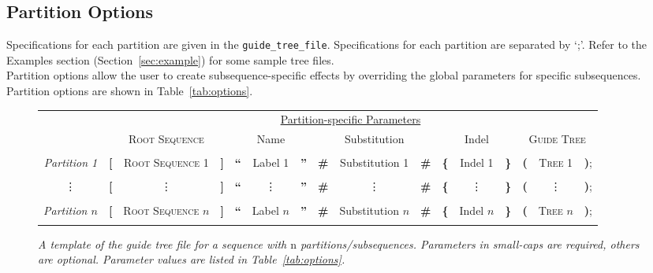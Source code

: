 \documentclass[10pt]{article}
\begin{document}
\subsection{Partition Options}
\label{sec:partition_options}

 Specifications for each partition are given in the {\tt guide\_tree\_file}. Specifications for each partition are separated by `;'. Refer to the Examples section (Section~\ref{sec:example}) for some sample tree files.\\

 Partition options allow the user to create subsequence-specific effects by overriding the global parameters for specific subsequences. Partition options are shown in Table~\ref{tab:options}.

\begin{figure}
 \begin{small}
 \begin{tabular}{c|lcrlcrlcrlcrlcr}
 \hline
 \hline
  & \multicolumn{15}{c}{\underline{Partition-specific Parameters}}
  \\

  & \multicolumn{3}{c}{\textsc{Root Sequence}}
  & \multicolumn{3}{c}{Name}
  & \multicolumn{3}{c}{Substitution} 
  & \multicolumn{3}{c}{Indel}
  & \multicolumn{3}{c}{\textsc{Guide Tree}}
  \\
 \hline
\\
 \textit{Partition 1} & 
 \textbf{[}  & \textsc{Root Sequence 1} & \textbf{]} &
 \textbf{``} & Label 1         			& \textbf{''} &
 \textbf{\#} & Substitution 1  			& \textbf{\#}&
 \textbf{\{} & Indel 1         			& \textbf{\}} &
 \textbf{(}  & \textsc{Tree 1}          & \textbf{)};
 \\
 \\
 \vdots &
 \textbf{[}  & \vdots & \textbf{]} &
 \textbf{``} & \vdots & \textbf{''} &
 \textbf{\#} & \vdots & \textbf{\#}&
 \textbf{\{} & \vdots & \textbf{\}} &
 \textbf{(}  & \vdots & \textbf{)};
 \\
 \\
 \textit{Partition $n$} &
 \textbf{[}  & \textsc{Root Sequence $n$} & \textbf{]} &
 \textbf{``} & Label $n$         		  & \textbf{''} &
 \textbf{\#} & Substitution $n$  		  & \textbf{\#}&
 \textbf{\{} & Indel $n$                  & \textbf{\}} &
 \textbf{(}  & \textsc{Tree $n$}          & \textbf{)};
 \\
 \\
 \hline
 \hline
 \end{tabular}
\end{small}
\caption{\textit{A template of the guide tree file for a sequence with $\mathrm{n}$ partitions/subsequences. Parameters in small-caps are required, others are optional. Parameter values are listed in Table~\ref{tab:options}.}}
\end{figure}
\end{document}
